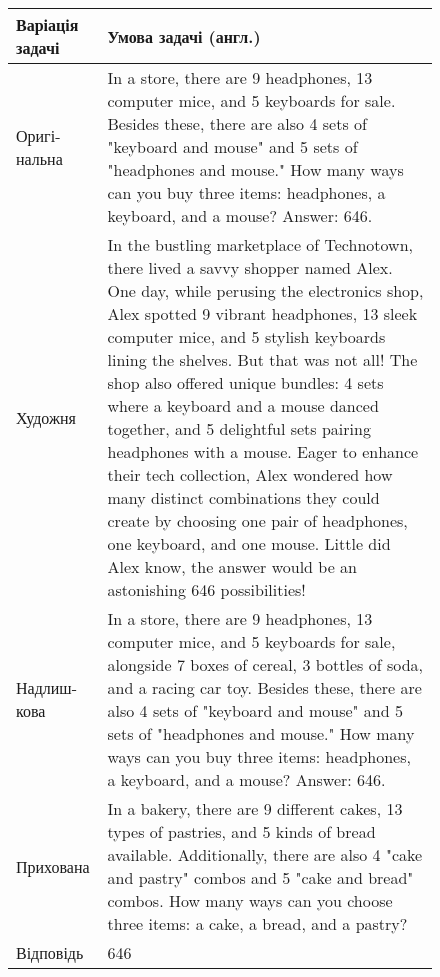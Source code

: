 \renewcommand{\arraystretch}{0.8} %
\begin{figure}[h!]
\centering
\small
{}
\label{tab:problem_example_35}
\begin{tabular}{|p{2cm}|p{14cm}|}
    \hline
    \textbf{Варіація задачі} & \textbf{Умова задачі (англ.)} \\
    \hline
    Оригі-нальна & In a store, there are 9 headphones, 13 computer mice, and 5 keyboards for sale. Besides these, there are also 4 sets of "keyboard and mouse" and 5 sets of "headphones and mouse." How many ways can you buy three items: headphones, a keyboard, and a mouse? Answer: 646. \\ \hline
    Художня & In the bustling marketplace of Technotown, there lived a savvy shopper named Alex. One day, while perusing the electronics shop, Alex spotted 9 vibrant headphones, 13 sleek computer mice, and 5 stylish keyboards lining the shelves. But that was not all! The shop also offered unique bundles: 4 sets where a keyboard and a mouse danced together, and 5 delightful sets pairing headphones with a mouse. Eager to enhance their tech collection, Alex wondered how many distinct combinations they could create by choosing one pair of headphones, one keyboard, and one mouse. Little did Alex know, the answer would be an astonishing 646 possibilities! \\ \hline
    Надлиш-кова & In a store, there are 9 headphones, 13 computer mice, and 5 keyboards for sale, alongside 7 boxes of cereal, 3 bottles of soda, and a racing car toy. Besides these, there are also 4 sets of "keyboard and mouse" and 5 sets of "headphones and mouse." How many ways can you buy three items: headphones, a keyboard, and a mouse? Answer: 646. \\ \hline
    Прихована & In a bakery, there are 9 different cakes, 13 types of pastries, and 5 kinds of bread available. Additionally, there are also 4 "cake and pastry" combos and 5 "cake and bread" combos. How many ways can you choose three items: a cake, a bread, and a pastry? \\ \hline
    Відповідь & 646 \\ \hline
\end{tabular}
\end{figure}

